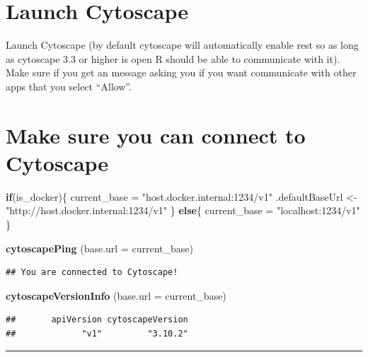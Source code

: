 \documentclass[
]{book}
\newenvironment{Shaded}{\begin{snugshade}}{\end{snugshade}}
\newcommand{\AttributeTok}[1]{\textcolor[rgb]{0.13,0.29,0.53}{#1}}
\newcommand{\ControlFlowTok}[1]{\textcolor[rgb]{0.13,0.29,0.53}{\textbf{#1}}}
\newcommand{\FunctionTok}[1]{\textcolor[rgb]{0.13,0.29,0.53}{\textbf{#1}}}
\newcommand{\NormalTok}[1]{#1}
\newcommand{\OtherTok}[1]{\textcolor[rgb]{0.56,0.35,0.01}{#1}}
\newcommand{\StringTok}[1]{\textcolor[rgb]{0.31,0.60,0.02}{#1}}
\begin{document}
\section{Launch Cytoscape}\label{launch-cytoscape-1}

Launch Cytoscape (by default cytoscape will automatically enable rest so as long as cytoscape 3.3 or higher is open R should be able to communicate with it). Make sure if you get an message asking you if you want communicate with other apps that you select ``Allow''.

\section{Make sure you can connect to Cytoscape}\label{make-sure-you-can-connect-to-cytoscape-1}

\begin{Shaded}
\begin{Highlighting}[]
\ControlFlowTok{if}\NormalTok{(is\_docker)\{}
\NormalTok{  current\_base }\OtherTok{=} \StringTok{"host.docker.internal:1234/v1"}
\NormalTok{  .defaultBaseUrl }\OtherTok{\textless{}{-}} \StringTok{"http://host.docker.internal:1234/v1"}
\NormalTok{\} }\ControlFlowTok{else}\NormalTok{\{}
\NormalTok{  current\_base }\OtherTok{=} \StringTok{"localhost:1234/v1"}
\NormalTok{\}}

\FunctionTok{cytoscapePing}\NormalTok{ (}\AttributeTok{base.url =}\NormalTok{ current\_base)}
\end{Highlighting}
\end{Shaded}

\begin{verbatim}
## You are connected to Cytoscape!
\end{verbatim}

\begin{Shaded}
\begin{Highlighting}[]
\FunctionTok{cytoscapeVersionInfo}\NormalTok{ (}\AttributeTok{base.url =}\NormalTok{ current\_base)}
\end{Highlighting}
\end{Shaded}

\begin{verbatim}
##       apiVersion cytoscapeVersion 
##             "v1"         "3.10.2"
\end{verbatim}

\begin{center}\rule{0.5\linewidth}{0.5pt}\end{center}
\end{document}
